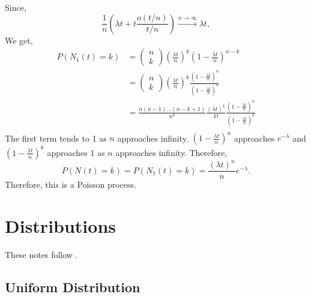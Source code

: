 \documentclass{article}
\begin{document}
Since,
\begin{equation*}
    \frac{1}{n} \left( \lambda t + t \frac{o(t / n)}{t / n} \right) \xrightarrow{n \rightarrow \infty} \lambda t,
\end{equation*}
We get,
\begin{align*}
    P(N_1(t) = k) & =
    \begin{pmatrix} n \\ k \end{pmatrix}
    \left( \frac{\lambda t}{n} \right)^k
    \left( 1 - \frac{\lambda t}{n} \right) ^ {n - k} \\
    & =
    \begin{pmatrix} n \\ k \end{pmatrix}
    \left( \frac{\lambda t}{n} \right)^k
    \frac{(1 - \frac{\lambda t}{n})^n}{(1 - \frac{\lambda t}{n})^k} \\
    & =
    \frac{n(n - 1)\dots(n - k + 1)}{n^k}
    \frac{(\lambda t)^k}{k!}
    \frac{(1 - \frac{\lambda t}{n})^n}{(1 - \frac{\lambda t}{n})^k} \\
\end{align*}
The first term tends to 1 as $n$ approaches infinity. $(1 - \frac{\lambda t}{n})^n$ approaches $e^{-\lambda}$ and $(1 - \frac{\lambda t}{n})^k$ approaches 1 as $n$ approaches infinity. Therefore,
\begin{equation*}
    P(N(t) = k) = P(N_1(t) = k) = \frac{(\lambda t) ^ n}{n} e^{-\lambda}.
\end{equation*}
Therefore, this is a Poisson process.

\section{Distributions}

These notes follow \cite{ross98}.

\subsection{Uniform Distribution}
\end{document}
